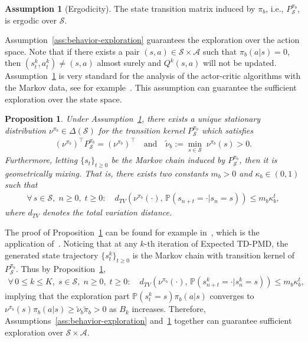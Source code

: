 \documentclass[10pt]{article}
\newcommand{\calA}{\mathcal{A}}
\newcommand{\calS}{\mathcal{S}}
\renewcommand{\P}{\mathbb{P}}
\theoremstyle{plain}
\newtheorem{proposition}[theorem]{Proposition}
\theoremstyle{definition}
\newtheorem{assumption}[theorem]{Assumption}
\begin{document}
\begin{assumption}[Ergodicity]
    The state transition matrix induced by $\pi_b$, i.e., $P^{\pi_b}_{\scriptscriptstyle \calS}$, is ergodic over $\calS$. 
    \label{ass:ergodicity}
\end{assumption}
Assumption~\ref{ass:behavior-exploration} guarantees the exploration over the action space. Note that if there exists a pair $(s,a)\in\calS\times\calA$ such that $\pi_b(a|s)=0$, then $(s_t^k, a_t^k)\neq(s,a)$ almost surely and $Q^k(s,a)$ will not be updated. 
Assumption~\ref{ass:ergodicity} is very standard for the analysis of the actor-critic algorithms with the Markov data, see for example~\citet{li2024stochastic,khodadadian2021finite,khodadadian2022finite}. This assumption can guarantee the sufficient exploration over the state space.
\begin{proposition}
   Under Assumption~\ref{ass:ergodicity}, there exists a unique stationary distribution $\nu^{\pi_b} \in \Delta(\calS)$ for the transition kernel $P^{\pi_b}_{\scriptscriptstyle\calS}$ which satisfies
    \begin{align*}
        (\nu^{\pi_b})^\top P^{\pi_b}_{\scriptscriptstyle\calS} = (\nu^{\pi_b})^\top\quad\mbox{and}\quad \tilde\nu_b := \min_{s\in\calS} \; \nu^{\pi_b}(s) > 0.
    \end{align*}
    Furthermore, letting $\{ s_t \}_{t\geq0}$ be the Markov chain induced by $P^{\pi_b}_{\scriptscriptstyle\calS}$, then it is geometrically mixing. That is, there exists two constants $m_b>0$ and  $\kappa_b\in(0,1)$ such that
    \begin{align*}
        \forall\, s\in\calS, \; n \geq 0, \; t\geq0: \quad  d_{TV}(\nu^{\pi_b}(\cdot), \, \P(s_{n+t} = \cdot | s_n = s)) \leq m_b\kappa_b^t,
    \end{align*}
    where $d_{TV}$ denotes the total variation distance.
    \label{pro:MDP-ergodicity}
\end{proposition}

The proof of Proposition~\ref{pro:MDP-ergodicity} can be found for example in~\citet{khodadadian2021finite}, {which is the application of~\citet[Theorem~4.9]{levin2017markov}}. Noticing that at any $k$-th iteration of Expected TD-PMD, the generated state trajectory $\{ s_t^k \}_{t\geq 0}$ is the Markov chain with transition kernel of $P^{\pi_b}_{\scriptscriptstyle\calS}$. Thus by Proposition~\ref{pro:MDP-ergodicity},
\begin{align}
    \forall\, 0 \leq k\leq K, \; s\in\calS, \; n \geq 0, \; t\geq0: \quad  d_{TV}(\nu^{\pi_b}(\cdot), \, \P(s_{n+t}^k = \cdot | s_n^k = s)) \leq m_b\kappa_b^t,
    \label{eq:Expected-TD-AC-PMD:MDP-ergodicity}
\end{align}
implying that the exploration part $\P(s_t^k=s)\pi_b(a|s)$ converges to $\nu^{\pi_b}(s)\pi_b(a|s) \geq \tilde\nu_b\tilde\pi_b > 0$ as $B_k$ increases. Therefore,  Assumptions~\ref{ass:behavior-exploration} and~\ref{ass:ergodicity} together can guarantee sufficient exploration over $\calS\times\calA$.
\end{document}
